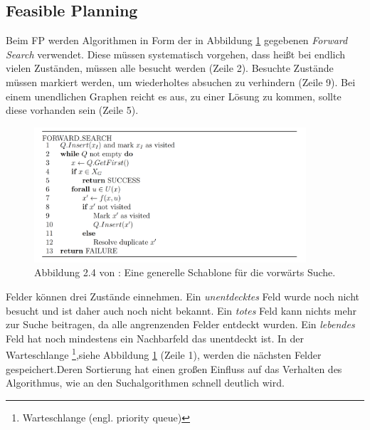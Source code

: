 \subsection {Feasible Planning}
Beim FP werden Algorithmen in Form der in Abbildung \ref{lav04} gegebenen \textit{Forward Search} verwendet. Diese müssen systematisch vorgehen, dass heißt bei endlich vielen Zuständen, müssen alle besucht werden (Zeile 2). Besuchte Zustände müssen markiert werden, um wiederholtes absuchen zu verhindern (Zeile 9). Bei einem unendlichen Graphen reicht es aus, zu einer Lösung zu kommen, sollte diese vorhanden sein (Zeile 5).\cite[~S. 32]{Lav06}

\begin{figure}
	\centering
	\includegraphics[width=0.9\textwidth]{images/img225.png}
	\caption{Abbildung 2.4 von \cite[~S. 33]{Lav06}:  Eine generelle Schablone für die vorwärts Suche.}
	\label{lav04}
\end{figure}
\noindent
Felder können drei Zustände einnehmen.
Ein \textit{unentdecktes} Feld wurde noch nicht besucht und ist daher auch noch nicht bekannt.
Ein \textit{totes} Feld kann nichts mehr zur Suche beitragen, da alle angrenzenden Felder entdeckt wurden.
Ein \textit{lebendes} Feld hat noch mindestens ein Nachbarfeld das unentdeckt ist.
%
%
In der Warteschlange \footnote{Warteschlange (engl. priority queue)},siehe Abbildung \ref{lav04} (Zeile 1), werden die nächsten Felder gespeichert.Deren Sortierung hat einen großen Einfluss auf das Verhalten des Algorithmus, wie an den Suchalgorithmen schnell deutlich wird. 
